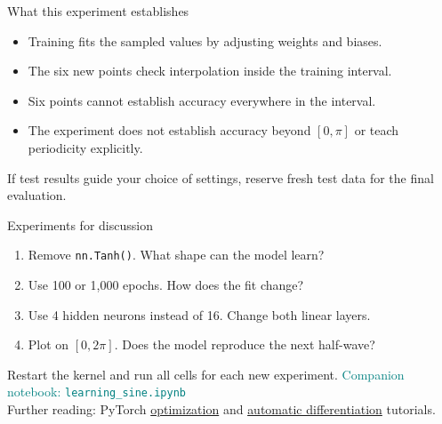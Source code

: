\documentclass[aspectratio=169,11pt]{beamer}
\begin{document}
\begin{frame}{What this experiment establishes}
\begin{itemize}\setlength\itemsep{5mm}
\item Training fits the sampled values by adjusting weights and biases.
\item The six new points check \alert{interpolation} inside the training interval.
\item Six points cannot establish accuracy everywhere in the interval.
\item The experiment does not establish accuracy beyond $[0,\pi]$ or teach periodicity explicitly.
\end{itemize}
\vspace{4mm}
If test results guide your choice of settings, reserve fresh test data for the final evaluation.
\end{frame}

\begin{frame}{Experiments for discussion}
\begin{enumerate}\setlength\itemsep{4mm}
\item Remove \texttt{nn.Tanh()}. What shape can the model learn?
\item Use 100 or 1,000 epochs. How does the fit change?
\item Use 4 hidden neurons instead of 16. Change both linear layers.
\item Plot on $[0,2\pi]$. Does the model reproduce the next half-wave?
\end{enumerate}
\vspace{5mm}
Restart the kernel and run all cells for each new experiment.
\vfill
\small\textcolor{Teal}{Companion notebook: \texttt{learning\_sine.ipynb}}\\[2mm]
\tiny Further reading: PyTorch \href{https://docs.pytorch.org/tutorials/beginner/basics/optimization_tutorial.html}{optimization} and
\href{https://docs.pytorch.org/tutorials/beginner/basics/autogradqs_tutorial.html}{automatic differentiation} tutorials.
\end{frame}
\end{document}
